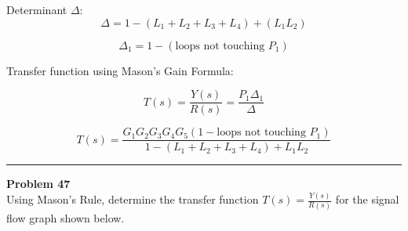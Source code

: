Determinant \(\Delta\):
\[
\Delta = 1 - (L_1 + L_2 + L_3 + L_4) + (L_1 L_2) 
\]

\[
\Delta_1 = 1 - (\text{loops not touching } P_1)
\]

Transfer function using Mason's Gain Formula:

\[
T(s) = \frac{Y(s)}{R(s)} = \frac{P_1 \Delta_1}{\Delta}
\]

\[
\boxed{
T(s) = \frac{G_1 G_2 G_3 G_4 G_5 (1 - \text{loops not touching } P_1)}{1 - (L_1 + L_2 + L_3 + L_4) + L_1 L_2}
}
\]

\newpage

\noindent\rule{\textwidth}{1pt}
\noindent\textbf{Problem 47} \hfill
\\ Using Mason's Rule, determine the transfer function \(T(s) = \frac{Y(s)}{R(s)}\) for the signal flow graph shown below.

